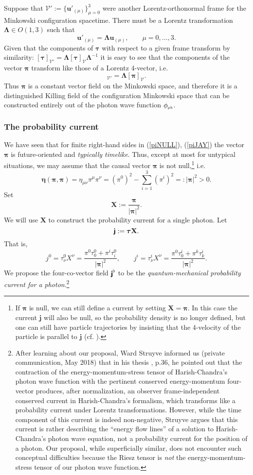 \documentclass[11pt]{article}
\theoremstyle{definition}
\newcommand{\refeq}[1]{(\ref{#1})}
\newcommand{\tenseur}[1]{{\textbf{\textsf{#1}}}}
\newcommand{\bMj}{{\tenseur{j}}}
\newcommand{\bpi}{\boldsymbol{\pi}}
\numberwithin{equation}{section}
\newcommand{\bj}{\mathbf{j}}
\newcommand{\bu}{\mathbf{u}}
\newcommand{\bX}{\mathbf{X}}
\newcommand{\btau}{\boldsymbol{\tau}}
\newcommand{\beq}{\begin{equation}}
\newcommand{\eeq}{\end{equation}}
\newcommand{\cV}{\mathcal{V}}
\newcommand{\bLa}{\boldsymbol{\Lambda}}
\newcommand{\phiPH}{{\phi_{\mbox{\rm\tiny ph}}}}
\begin{document}
 Suppose that $\cV' := \{\bu'_{(\mu)}\}_{\mu=0}^3$ were another Lorentz-orthonormal frame for the Minkowski configuration spacetime. 
 There must be a Lorentz transformation $\bLa \in O(1,3)$ such that 
\beq
\bu'_{(\mu)} = \bLa \bu_{(\mu)},\qquad \mu = 0,\dots,3.
\eeq
Given that the components of $\btau$ with respect to a given frame transform by similarity: 
$[\btau]_{\cV'} = \bLa [\btau]_{\cV} \bLa^{-1}$ it is easy to see that the components of the vector $\bpi$ transform like those of a 
Lorentz 4-vector, i.e. 
\beq 
[\bpi]_{\cV'} = \bLa [\bpi]_{\cV}.
\eeq
Thus $\bpi$ is a constant vector field on the Minkowski space, and therefore it is a distinguished Killing field of the configuration 
Minkowski space that can be constructed entirely out of the photon wave function $\phiPH$.  
\subsubsection{The probability current}
 We have seen that for finite right-hand sides in \refeq{piNULL}, \refeq{piJAY} the vector $\bpi$ is 
future-oriented and \emph{typically timelike}.
 Thus, except at most for untypical situations, we may assume that the causal vector $\bpi$ is not null,\footnote{If 
   $\bpi$ is null, we can still define a current by setting $\bX = \bpi$. 
 In this case the current $\bj$ will also be null, so the probability density is no longer defined, but one can still have particle 
   trajectories by insisting that the 4-velocity of the particle is parallel to $\bj$ (cf. \cite{BerndlETal}).}
i.e. 
\beq
\boldsymbol{\eta} (\bpi,\bpi) = \eta_{\mu\nu}\pi^\mu \pi^\nu = 
 (\pi^0)^2 - \sum_{i=1}^3 (\pi^i)^2  =: |\bpi|^2 >0.
\eeq
 Set
\beq
\bX := \frac{\bpi}{|\bpi|^2}.
\eeq
 We will use $\bX$ to construct the probability current for a single photon. 
 Let
\beq \label{def:j}
\bMj := \btau \bX.
\eeq
 That is,
\beq
j^0 = \tau^0_\nu X^\nu = \frac{\pi^0 \tau^0_0 + \pi^i \tau^0_i}{|\bpi|^2},\qquad
j^i = \tau^i_\nu X^\nu = \frac{\pi^0 \tau^i_0 + \pi^k \tau^i_k}{|\bpi|^2}.
\eeq
 We propose the four-co-vector field $\bMj^\flat$ to be the \emph{quantum-mechanical probability current for a photon}.\footnote{After 
   learning about our proposal, Ward Struyve informed us (private communication, May 2018) that in his thesis \cite{StruyvePHD}, p.36, 
   he pointed out that the contraction of the energy-momentum-stress tensor of Harish-Chandra's photon wave function with the pertinent conserved
   energy-momentum four-vector produces, after normalization, an observer frame-independent conserved current in Harish-Chandra's formalism, 
   which transforms like a probability current under Lorentz transformations.
   However, while the time component of this current is indeed non-negative, Struyve argues that this current is rather describing the 
   ``energy flow lines'' of a solution to Harish-Chandra's photon wave equation, not a probability current for the position of a photon. 
    Our proposal, while superficially similar, does not encounter such conceptual difficulties because the Riesz tensor is \emph{not} the 
    energy-momentum-stress tensor of our photon wave function.\label{fn:Ward}}
\end{document}
